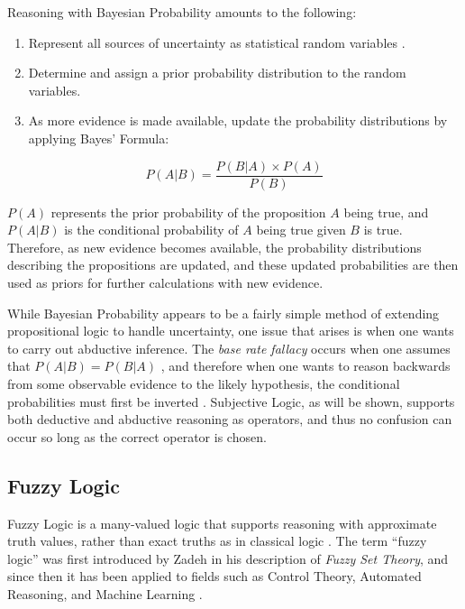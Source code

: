 \documentclass[thesis.tex]{subfiles}
\begin{document}
Reasoning with Bayesian Probability amounts to the following:

\begin{enumerate}
  \item Represent all sources of uncertainty as statistical random variables \cite{dupre2009new}.
  \item Determine and assign a prior probability distribution to the random variables.
  \item As more evidence is made available, update the probability distributions by applying Bayes' Formula:
\end{enumerate}

$$
P(A | B) = \frac{P(B | A) \times P(A)}{P(B)}
$$

$P(A)$ represents the prior probability of the proposition $A$ being true, and $P(A | B)$
is the conditional probability of $A$ being true given $B$ is true. Therefore, as new evidence becomes
available, the probability distributions describing the propositions are updated, and these
updated probabilities are then used as priors for further calculations with new evidence.

While Bayesian Probability appears to be a fairly simple method of extending propositional
logic to handle uncertainty, one issue that arises is when one wants to carry out
abductive inference. The \emph{base rate fallacy} occurs when one assumes that
$P(A | B) = P(B | A)$ \cite{koehler1996base}, and therefore when one wants to reason backwards from
some observable evidence to the likely hypothesis, the conditional probabilities must
first be inverted \cite{josanginverting}. Subjective Logic, as will be shown, supports both deductive and
abductive reasoning as operators, and thus no confusion can occur so long as the correct
operator is chosen.





\subsection{Fuzzy Logic}

Fuzzy Logic is a many-valued logic that supports reasoning with approximate
truth values, rather than exact truths as in classical logic \cite{perfilieva1999mathematical}.
The term ``fuzzy logic'' was first introduced by Zadeh \cite{zadeh1965fuzzy} in his description
of \emph{Fuzzy Set Theory}, and since then it has been applied to fields such as
Control Theory, Automated Reasoning, and Machine Learning \cite{bansod2005soft}.
\end{document}
